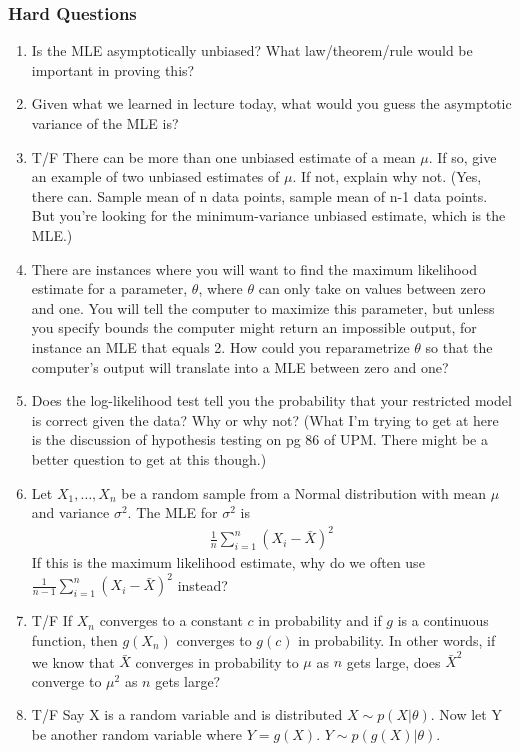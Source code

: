 \documentclass[11pt]{article}
\begin{document}
\subsubsection{Hard Questions}
\begin{enumerate}
\item Is the MLE asymptotically unbiased?  What law/theorem/rule would be important in proving this? 
\item Given what we learned in lecture today, what would you guess the asymptotic variance of the MLE is?  
\item T/F There can be more than one unbiased estimate of a mean $\mu$.  If so, give an example of two unbiased estimates of $\mu$.  If not, explain why not. (Yes, there can.  Sample mean of n data points, sample mean of n-1 data points.  But you're looking for the minimum-variance unbiased estimate, which is the MLE.)
\item There are instances where you will want to find the maximum likelihood estimate for a parameter, $\theta$, where $\theta$ can only take on values between zero and one.  You will tell the computer to maximize this parameter, but unless you specify bounds the computer might return an impossible output, for instance an MLE that equals 2.  How could you reparametrize $\theta$ so that the computer's output will translate into a MLE between zero and one? 
\item Does the log-likelihood test tell you the probability that your restricted model is correct given the data?  Why or why not?  (What I'm trying to get at here is the discussion of hypothesis testing on pg 86 of UPM.  There might be a better question to get at this though.) 
\item Let $X_1, \ldots, X_n$ be a random sample from a Normal distribution with mean $\mu$ and variance $\sigma^2$.  The MLE for $\sigma^2$ is 
\begin{eqnarray*}
\frac{1}{n}\sum_{i=1}^n (X_i-\bar{X})^2
\end{eqnarray*}
If this is the maximum likelihood estimate, why do we often use $\frac{1}{n-1}\sum_{i=1}^n (X_i-\bar{X})^2$ instead? 
\item T/F If $X_n$ converges to a constant $c$ in probability and if $g$ is a continuous function, then $g(X_n)$ converges to $g(c)$ in probability.  In other words, if we know that $\bar{X}$ converges in probability to $\mu$ as $n$ gets large, does $\bar{X}^2$ converge to $\mu^2$ as $n$ gets large? 
\item T/F Say X is a random variable and is distributed $X \sim p(X|\theta)$.  Now let Y be another random variable where $Y = g(X)$.  $Y \sim p(g(X)|\theta)$.  
\end{enumerate}
\end{document}
